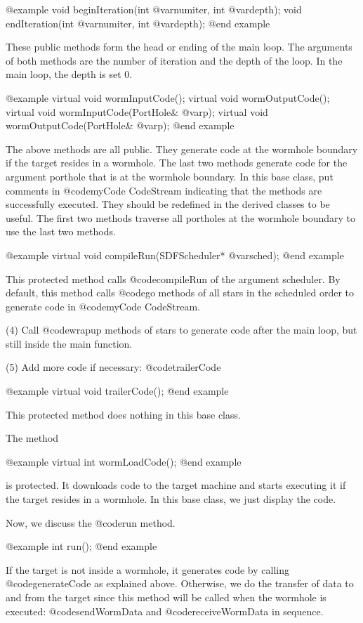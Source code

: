 @example
void beginIteration(int @var{numiter}, int @var{depth});
void endIteration(int @var{numiter}, int @var{depth});
@end example

These public methods form the head or ending of the main loop. The
arguments of both methods are the number of iteration and the depth of
the loop. In the main loop, the depth is set 0.

@example
virtual void wormInputCode();
virtual void wormOutputCode();
virtual void wormInputCode(PortHole& @var{p});
virtual void wormOutputCode(PortHole& @var{p});
@end example

The above methods are all public. They generate code at the wormhole
boundary if the target resides in a wormhole. The last two methods
generate code for the argument porthole that is at the wormhole
boundary. In this base class, put comments in @code{myCode} CodeStream
indicating that the methods are successfully executed. They should be
redefined in the derived classes to be useful. The first two methods
traverse all portholes at the wormhole boundary to use the last two
methods.

@example
virtual void compileRun(SDFScheduler* @var{sched});
@end example

This protected method calls @code{compileRun} of the argument scheduler. 
By default, this method calls @code{go} methods of all stars in the
scheduled order to generate code in @code{myCode} CodeStream.

(4) Call @code{wrapup} methods of stars to generate code after the main
loop, but still inside the main function.

(5) Add more code if necessary: @code{trailerCode}

@example
virtual void trailerCode();
@end example

This protected method does nothing in this base class.

The method

@example
virtual int wormLoadCode();
@end example

is protected. It downloads code to the target machine
and starts executing it if the target resides in a wormhole. In this
base class, we just display the code.

Now, we discuss the @code{run} method.

@example
int run();
@end example

If the target is not inside a wormhole, it generates code by calling
@code{generateCode} as explained above. Otherwise, we do the transfer of
data to and from the target since this method will be called when the
wormhole is executed: @code{sendWormData} and @code{receiveWormData}
in sequence.

